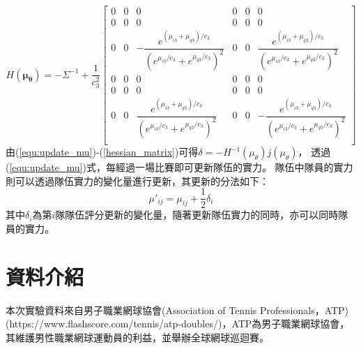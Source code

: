 \documentclass[12pt]{article}
\begin{document}
\begin{equation}
\textit{H}(\boldsymbol{\mu_{\theta}}) = - \Sigma^{-1} + \dfrac{1}{c^2_3}
\begin{bmatrix}
0&0&0&0&0&0\\
0&0&0&0&0&0\\
0&0&-\dfrac{e^{(\mu_{i3}+\mu_{q3})/c_3}}{(e^{\mu_{i3}/c_3}+e^{\mu_{q3}/c_3})^2}&0&0&\dfrac{e^{(\mu_{i3}+\mu_{q3})/c_3}}{(e^{\mu_{i3}/c_3}+e^{\mu_{q3}/c_3})^2}\\
0&0&0&0&0&0\\
0&0&0&0&0&0\\
0&0&\dfrac{e^{(\mu_{i3}+\mu_{q3})/c_3}}{(e^{\mu_{i3}/c_3}+e^{\mu_{q3}/c_3})^2}&0&0&-\dfrac{e^{(\mu_{i3}+\mu_{q3})/c_3}}{(e^{\mu_{i3}/c_3}+e^{\mu_{q3}/c_3})^2}\\
\end{bmatrix}
\label{hessian_matrix}
\end{equation}
由(\ref{equ:update_mu})-(\ref{hessian_matrix})可得$\delta = -\textit{H}^{-1}(\mu_{\theta})j(\mu_{\theta})$，
透過(\ref{equ:update_mu})式，每經過一場比賽即可更新隊伍的實力。
隊伍中隊員的實力則可以透過隊伍實力的變化量進行更新，其更新的分法如下：
\begin{equation}
\mu'_{ij} = \mu_{ij} + \dfrac{1}{2}\delta_i 
\end{equation}
其中$\delta_i$為第$i$隊隊伍評分更新的變化量，隨著更新隊伍實力的同時，亦可以同時隊員的實力。
\section{資料介紹}
本次實驗資料來自男子職業網球協會(Association of Tennis Professionals，ATP)
(https://www.flashscore.com/tennis/atp-doubles/)，ATP為男子職業網球協會，其維護男性職業網球運動員的利益，並舉辦全球網球巡迴賽。
\end{document}
